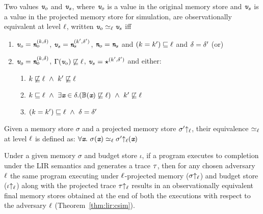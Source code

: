 \begin{mydef}
\label{def:lir:eq}
Two values $\emph{\texttt{v}}_o$ and $\emph{\texttt{v}}_s$, where $\emph{\texttt{v}}_o$ is a value in the original
memory store and $\emph{\texttt{v}}_s$ is a value in the projected memory store for
simulation, are observationally equivalent at level $\ell$,
written $\emph{\texttt{v}}_o \simeq_\ell \emph{\texttt{v}}_s$ iff
\begin{enumerate}[label=\emph{\arabic*}., ref={\ref{def:lir:eq}.\arabic*}]
\item\label{def:lir:eq-1} $\emph{\texttt{v}}_o = \emph{\texttt{n}}_o^{(k, \delta)}$, $\emph{\texttt{v}}_s =
  \emph{\texttt{n}}_s^{(k',\delta')}$, $\emph{\texttt{n}}_o = \emph{\texttt{n}}_s$ and
  $(k = k') \sqsubseteq \ell$ and $\delta = \delta'$ (or)
\item\label{def:lir:eq-2} $\emph{\texttt{v}}_o = \emph{\texttt{n}}_o^{(k, \delta)}$, $\Gamma(\emph{\texttt{v}}_o) \not\sqsubseteq
  \ell$,  $\emph{\texttt{v}}_s = \star^{(k',\delta')}$ and either:
  \begin{enumerate}[label=\emph{(\alph*)}, ref={\ref{def:lir:eq-2}(\alph*)}]
  \item\label{def:lir:eq-2a} $k \not\sqsubseteq \ell ~\wedge ~k'
    \not\sqsubseteq \ell$
  \item \label{def:lir:eq-2b} $k \sqsubseteq \ell~\wedge~\exists \emph{\texttt{x}} \in
    \delta. (\mathbb{B}(\emph{\texttt{x}}) \not\sqsubseteq \ell) ~\wedge ~k' \not\sqsubseteq
    \ell$
  \item\label{def:lir:eq-2c} $(k = k') \sqsubseteq \ell~ \wedge
    ~\delta = \delta'$
  \end{enumerate}
\end{enumerate}
\end{mydef}

\begin{mydef}
\label{def:lir:simseq}
Given a memory store $\sigma$ and a projected memory store
$\sigma'{\uparrow_\ell}$, their equivalence $\simeq_\ell$ at level
$\ell$ is defined as: 
$\forall \emph{\texttt{x}}.~ \sigma(\emph{\texttt{x}}) \simeq_\ell
\sigma'{\uparrow_\ell}(\emph{\texttt{x}})$ 
\end{mydef}


Under a given memory $\sigma$ and budget store
$\iota$, if a program executes to completion under the LIR semantics
and generates a trace $\tau$, then for any chosen adversary
$\ell$ the same program executing under $\ell$-projected 
memory ($\sigma{\uparrow_\ell}$) and budget store ($\iota{\uparrow_\ell}$) along with the
projected trace $\tau{\uparrow_\ell}$ results in an observationally equivalent
final memory stores obtained at the end of both the executions with
respect to the adversary $\ell$ (Theorem~\ref{thm:lir:csim}).


